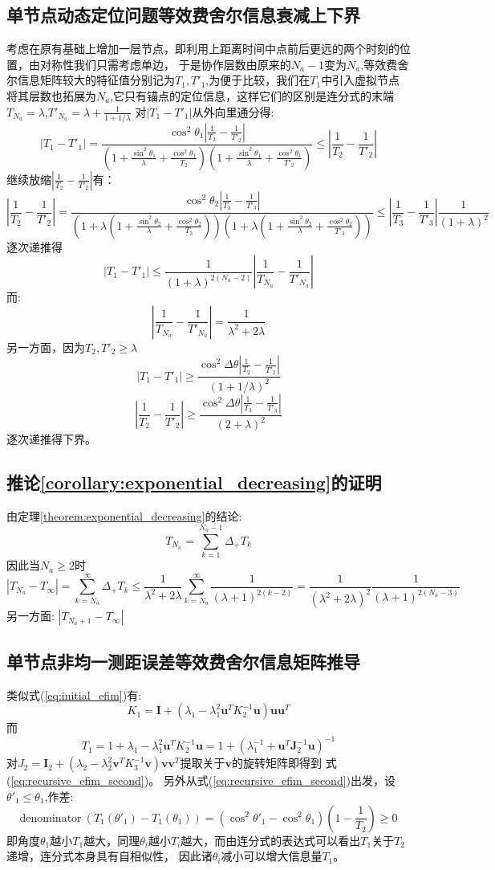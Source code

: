 \subsection{单节点动态定位问题等效费舍尔信息衰减上下界}\label{B_F_2}
考虑在原有基础上增加一层节点，即利用上距离时间中点前后更远的两个时刻的位置，由对称性我们只需考虑单边，
于是协作层数由原来的$N_a-1$变为$N_a$,等效费舍尔信息矩阵较大的特征值分别记为$T_1,T'_1$,为便于比较，我们在$T_1$中引入虚拟节点将其层数也拓展为$N_a$,它只有锚点的定位信息，这样它们的区别是连分式的末端$T_{N_a}=\lambda$,$T'_{N_a}=\lambda+\frac{1}{1+1/\lambda}$
对$|T_1-T'_1|$从外向里通分得:
\[
|T_1-T'_1|=\frac{\cos^2\theta_1|\frac{1}{T_2}-\frac{1}{T'_2}|}{(1+\frac{\sin^2\theta_1}{\lambda}+\frac{\cos^2\theta_1}{T_2})
(1+\frac{\sin^2\theta_1}{\lambda}+\frac{\cos^2\theta_1}{T'_2})}\leq |\frac{1}{T_2}-\frac{1}{T'_2}|
\]
继续放缩$|\frac{1}{T_2}-\frac{1}{T'_2}|$有：
\[
|\frac{1}{T_2}-\frac{1}{T'_2}|= \frac{\cos^2\theta_2|\frac{1}{T_3}-\frac{1}{T'_3}|}{(1+\lambda(1+\frac{\sin^2\theta_2}{\lambda}+\frac{\cos^2\theta_2}{T_3}))
(1+\lambda(1+\frac{\sin^2\theta_2}{\lambda}+\frac{\cos^2\theta_2}{T'_3}))}\leq |\frac{1}{T_3}-\frac{1}{T'_3}|\frac{1}{(1+\lambda)^2}
\]
逐次递推得
\[
|T_1-T'_1|\leq \frac{1}{(1+\lambda)^{2(N_a-2)}} |\frac{1}{T_{N_a}}-\frac{1}{T'_{N_a}}|
\]
而:
\[
|\frac{1}{T_{N_a}}-\frac{1}{T'_{N_a}}|=\frac{1}{\lambda^2+2\lambda}
\]
另一方面，因为$T_2,T'_2\geq \lambda$
\[
|T_1-T'_1|\geq \frac{\cos^2\Delta\theta|\frac{1}{T_2}-\frac{1}{T'_2}|}{(1+1/\lambda)^2}
\]
\[
|\frac{1}{T_2}-\frac{1}{T'_2}|\geq \frac{\cos^2\Delta\theta|\frac{1}{T_3}-\frac{1}{T'_3}|}{(2+\lambda)^2}
\]
逐次递推得下界。
\subsection{推论\ref{corollary:exponential_decreasing}的证明}\label{B_F_5}
由定理\ref{theorem:exponential_decreasing}的结论:
\[
T_{N_a}=\sum_{k=1}^{N_a-1}\Delta_{+}T_k
\]
因此当$N_a\geq 2$时
\[
|T_{N_a}-T_{\infty}|=\sum_{k=N_a}^{\infty}\Delta_{+}T_k\leq \frac{1}{\lambda^2+2\lambda}\sum_{k=N_a}^{\infty}\frac{1}{(\lambda+1)^{2(k-2)}}=\frac{1}{(\lambda^2+2\lambda)^2}\frac{1}{(\lambda+1)^{2(N_a-3)}}
\]
另一方面:
$|T_{N_a+1}-T_{\infty}|$
\subsection{单节点非均一测距误差等效费舍尔信息矩阵推导}\label{B_F_3}
类似式(\ref{eq:initial_efim})有:
\[
K_1=\bm{I}+(\lambda_1-\lambda_1^2 \bm{u}^T K_2^{-1}\bm{u})\bm{u}\bm{u}^T
\]
而
\[
T_1=1+\lambda_1-\lambda_1^2 \bm{u}^T K_2^{-1}\bm{u}=1+(\lambda_1^{-1}+\bm{u}^T\bm{J}_2^{-1}\bm{u})^{-1}
\]
对$J_2=\bm{I}_2+(\lambda_2-\lambda_2^2\bm{v}^T K_3^{-1}\bm{v})\bm{v}\bm{v}^T$提取关于$\bm{v}$的旋转矩阵即得到
式(\ref{eq:recursive_efim_second})。
另外从式(\ref{eq:recursive_efim_second})出发，设$\theta'_1\leq \theta_1$,作差:
\[
\text{denominator}~(T_1(\theta'_1)-T_1(\theta_1))=(\cos^2\theta'_1-\cos^2\theta_1)(1-\frac{1}{T_2})\geq 0
\]
即角度$\theta_1$越小$T_1$越大，同理$\theta_i$越小$T_i$越大，而由连分式的表达式可以看出$T_1$关于$T_2$递增，连分式本身具有自相似性，
因此诸$\theta_i$减小可以增大信息量$T_1$。
